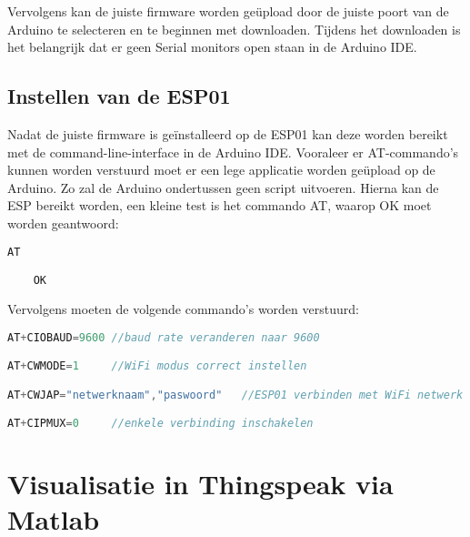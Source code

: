 Vervolgens kan de juiste firmware worden geüpload door de juiste poort van de Arduino te selecteren en te beginnen met downloaden. Tijdens het downloaden is het belangrijk dat er geen Serial monitors open staan in de Arduino IDE.



\subsection{Instellen van de ESP01}
\label{subsec:instellen}

Nadat de juiste firmware is geïnstalleerd op de ESP01 kan deze worden bereikt met de command-line-interface in de Arduino IDE. Vooraleer er AT-commando's kunnen worden verstuurd moet er een lege applicatie worden geüpload op de Arduino. Zo zal de Arduino ondertussen geen script uitvoeren. Hierna kan de ESP bereikt worden, een kleine test is het commando AT, waarop OK moet worden geantwoord:

\begin{lstlisting}[language=Java,caption={Test of de ESP01 bereikbaar is}]
AT

    OK
\end{lstlisting}

Vervolgens moeten de volgende commando's worden verstuurd:
\begin{lstlisting}[language=Java,caption={ESP01 voorbereiden}]
AT+CIOBAUD=9600 //baud rate veranderen naar 9600

AT+CWMODE=1     //WiFi modus correct instellen

AT+CWJAP="netwerknaam","paswoord"   //ESP01 verbinden met WiFi netwerk

AT+CIPMUX=0     //enkele verbinding inschakelen    
\end{lstlisting}


\section{Visualisatie in Thingspeak via Matlab}
\label{sec:matlab}

